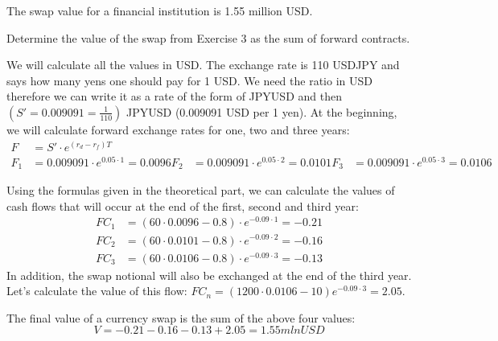 \documentclass[12pt,a4paper]{exam}
\begin{document}
\begin{questions}
\begin{solution}
The swap value for a financial institution is 1.55 million USD.
\end{solution}

\question Determine the value of the swap from Exercise 3 as the sum of forward contracts.

\begin{solution}
We will calculate all the values in USD. The exchange rate is 110 USDJPY and says how many yens one should pay for 1 USD. We need the ratio in USD therefore we can write it as a rate of the form of JPYUSD and then $(S'=0.009091=\frac{1}{110})$ JPYUSD (0.009091 USD per 1 yen). At the beginning, we will calculate forward exchange rates for one, two and three years:
\begin{equation*}
\begin{aligned}
F&=S'\cdot e^{(r_d-r_f)T}\\
F_1&=0.009091\cdot e^{0.05\cdot 1}=0.0096
F_2&=0.009091\cdot e^{0.05\cdot 2}=0.0101
F_3&=0.009091\cdot e^{0.05\cdot 3}=0.0106
\end{aligned}
\end{equation*}

Using the formulas given in the theoretical part, we can calculate the values of cash flows that will occur at the end of the first, second and third year:
\begin{equation*}
\begin{aligned}
FC_1&=(60\cdot0.0096-0.8)\cdot e^{-0.09\cdot1}=-0.21 \\
FC_2&=(60\cdot0.0101-0.8)\cdot e^{-0.09\cdot2}=-0.16 \\
FC_3&=(60\cdot0.0106-0.8)\cdot e^{-0.09\cdot3}=-0.13
\end{aligned}
\end{equation*}
In addition, the swap notional will also be exchanged at the end of the third year. Let’s calculate the value of this flow: $FC_n=(1200\cdot 0.0106-10)e^{-0.09\cdot3}=2.05$.

The final value of a currency swap is the sum of the above four values:
\begin{equation*}
V=-0.21-0.16-0.13+2.05=1.55 mln USD
\end{equation*}
\end{solution}


\end{questions}
\end{document}
